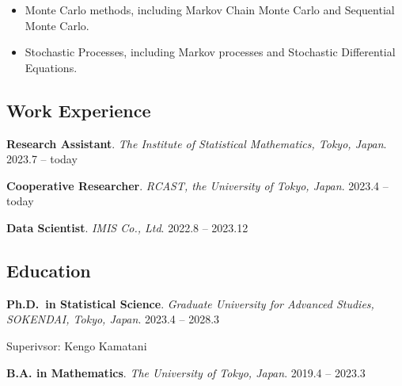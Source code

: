 \documentclass[
]{article}
\providecommand{\tightlist}{%
  \setlength{\itemsep}{0pt}\setlength{\parskip}{0pt}}\usepackage{longtable,booktabs,array}
\begin{document}
\begin{itemize}
\tightlist
\item
  Monte Carlo methods, including Markov Chain Monte Carlo and Sequential
  Monte Carlo.
\item
  Stochastic Processes, including Markov processes and Stochastic
  Differential Equations.
\end{itemize}

\subsection{Work Experience}\label{work-experience}

\textbf{Research Assistant}. \emph{The Institute of Statistical
Mathematics, Tokyo, Japan}. \hfill {2023.7 -- today}

\textbf{Cooperative Researcher}. \emph{RCAST, the University of Tokyo,
Japan}. \hfill {2023.4 -- today}

\textbf{Data Scientist}. \emph{IMIS Co., Ltd}. \hfill {2022.8 --
2023.12}

\subsection{Education}\label{education}

\textbf{Ph.D.~in Statistical Science}. \emph{Graduate University for
Advanced Studies, SOKENDAI, Tokyo, Japan}. \hfill {2023.4 -- 2028.3}

\par

Superivsor: Kengo Kamatani

\textbf{B.A. in Mathematics}. \emph{The University of Tokyo, Japan}.
\hfill {2019.4 -- 2023.3}
\end{document}
